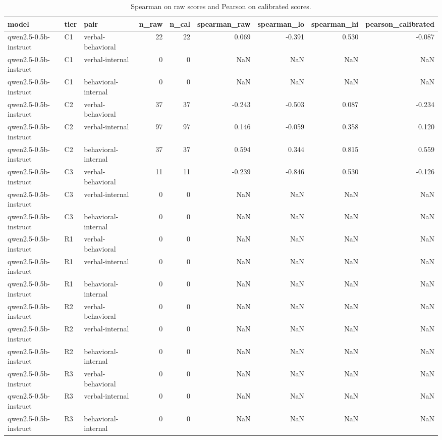 \begin{table}
\caption{Spearman on raw scores and Pearson on calibrated scores.}
\label{tab:t9_signal_correlations}
\begin{tabular}{lllrrrrrr}
\toprule
model & tier & pair & n\_raw & n\_cal & spearman\_raw & spearman\_lo & spearman\_hi & pearson\_calibrated \\
\midrule
qwen2.5-0.5b-instruct & C1 & verbal-behavioral & 22 & 22 & 0.069 & -0.391 & 0.530 & -0.087 \\
qwen2.5-0.5b-instruct & C1 & verbal-internal & 0 & 0 & NaN & NaN & NaN & NaN \\
qwen2.5-0.5b-instruct & C1 & behavioral-internal & 0 & 0 & NaN & NaN & NaN & NaN \\
qwen2.5-0.5b-instruct & C2 & verbal-behavioral & 37 & 37 & -0.243 & -0.503 & 0.087 & -0.234 \\
qwen2.5-0.5b-instruct & C2 & verbal-internal & 97 & 97 & 0.146 & -0.059 & 0.358 & 0.120 \\
qwen2.5-0.5b-instruct & C2 & behavioral-internal & 37 & 37 & 0.594 & 0.344 & 0.815 & 0.559 \\
qwen2.5-0.5b-instruct & C3 & verbal-behavioral & 11 & 11 & -0.239 & -0.846 & 0.530 & -0.126 \\
qwen2.5-0.5b-instruct & C3 & verbal-internal & 0 & 0 & NaN & NaN & NaN & NaN \\
qwen2.5-0.5b-instruct & C3 & behavioral-internal & 0 & 0 & NaN & NaN & NaN & NaN \\
qwen2.5-0.5b-instruct & R1 & verbal-behavioral & 0 & 0 & NaN & NaN & NaN & NaN \\
qwen2.5-0.5b-instruct & R1 & verbal-internal & 0 & 0 & NaN & NaN & NaN & NaN \\
qwen2.5-0.5b-instruct & R1 & behavioral-internal & 0 & 0 & NaN & NaN & NaN & NaN \\
qwen2.5-0.5b-instruct & R2 & verbal-behavioral & 0 & 0 & NaN & NaN & NaN & NaN \\
qwen2.5-0.5b-instruct & R2 & verbal-internal & 0 & 0 & NaN & NaN & NaN & NaN \\
qwen2.5-0.5b-instruct & R2 & behavioral-internal & 0 & 0 & NaN & NaN & NaN & NaN \\
qwen2.5-0.5b-instruct & R3 & verbal-behavioral & 0 & 0 & NaN & NaN & NaN & NaN \\
qwen2.5-0.5b-instruct & R3 & verbal-internal & 0 & 0 & NaN & NaN & NaN & NaN \\
qwen2.5-0.5b-instruct & R3 & behavioral-internal & 0 & 0 & NaN & NaN & NaN & NaN \\

\end{tabular}
\end{table}
